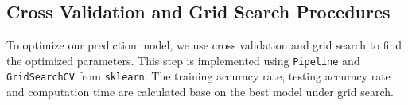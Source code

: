 \documentclass[11pt,a4paper]{article}
\begin{document}
    
    
    \subsection{Cross Validation and Grid Search Procedures}
    To optimize our prediction model, we use cross validation and grid search to find the optimized parameters. This step is implemented using \texttt{Pipeline} and \texttt{GridSearchCV} from \texttt{sklearn}. The training accuracy rate, testing accuracy rate and computation time are calculated base on the best model under grid search. \\









        
\end{document}
